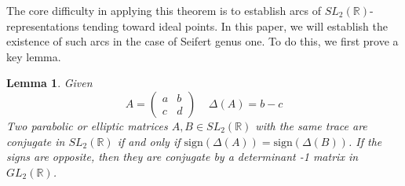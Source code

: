 \documentclass{article}
\theoremstyle{plain}
\theoremstyle{definition}
\theoremstyle{plain}
\theoremstyle{plain}
\theoremstyle{plain}
\newtheorem{lemma}[theorem]{Lemma}
\theoremstyle{remark}
\theoremstyle{remark}
\theoremstyle{plain}
\theoremstyle{plain}
\begin{document}
The core difficulty in applying this theorem is to establish arcs of $SL_2(\mathbb{R})$-representations tending toward ideal points. In this paper, we will establish the existence of such arcs in the case of Seifert genus one. To do this, we first prove a key lemma.

\begin{lemma}\label{lma:offdiag}
Given 
\begin{equation}
	A = \begin{pmatrix}a & b \\ c & d \end{pmatrix} \ \ \ \ \ \Delta(A) = b - c
\end{equation}
Two parabolic or elliptic matrices $A, B \in SL_2(\mathbb{R})$ with the same trace are conjugate in $SL_2(\mathbb{R})$ if and only if $\text{sign}(\Delta(A)) = \text{sign}(\Delta(B))$. If the signs are opposite, then they are conjugate by a determinant -1 matrix in $GL_2(\mathbb{R})$.
\end{lemma}
\end{document}
